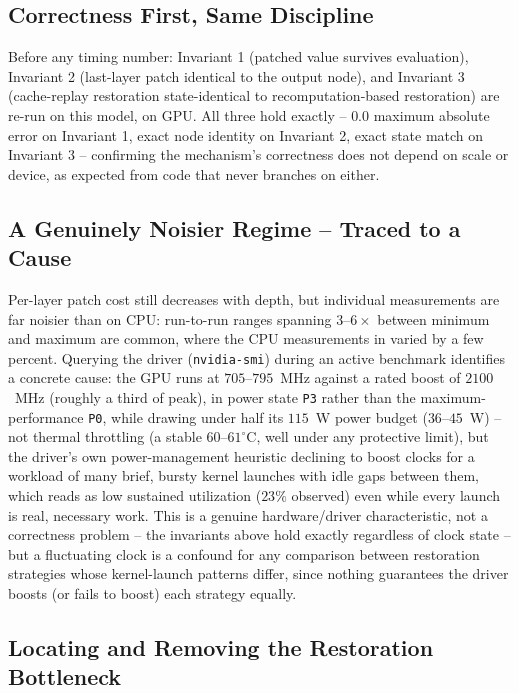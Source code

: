 \documentclass{article}
\begin{document}
\subsection{Correctness First, Same Discipline}

Before any timing number: Invariant 1 (patched value survives evaluation), Invariant 2 (last-layer
patch identical to the output node), and Invariant 3 (cache-replay restoration state-identical to
recomputation-based restoration) are re-run on this model, on GPU. All three hold exactly --
$0.0$ maximum absolute error on Invariant 1, exact node identity on Invariant 2, exact state match
on Invariant 3 -- confirming the mechanism's correctness does not depend on scale or device, as
expected from code that never branches on either.

\subsection{A Genuinely Noisier Regime -- Traced to a Cause}

Per-layer patch cost still decreases with depth, but individual measurements are far noisier than
on CPU: run-to-run ranges spanning $3$--$6\times$ between minimum and maximum are common, where the
CPU measurements in  varied by a few percent. Querying the driver
(\texttt{nvidia-smi}) during an active benchmark identifies a concrete cause: the GPU runs at
$705$--$795$~MHz against a rated boost of $2100$~MHz (roughly a third of peak), in power state
\texttt{P3} rather than the maximum-performance \texttt{P0}, while drawing under half its
$115$~W power budget ($36$--$45$~W) -- not thermal throttling (a stable $60$--$61^\circ$C, well
under any protective limit), but the driver's own power-management heuristic declining to boost
clocks for a workload of many brief, bursty kernel launches with idle gaps between them, which
reads as low sustained utilization ($23\%$ observed) even while every launch is real, necessary
work. This is a genuine hardware/driver characteristic, not a correctness problem -- the invariants
above hold exactly regardless of clock state -- but a fluctuating clock is a confound for any
comparison between restoration strategies whose kernel-launch patterns differ, since nothing
guarantees the driver boosts (or fails to boost) each strategy equally.

\subsection{Locating and Removing the Restoration Bottleneck}
\end{document}
